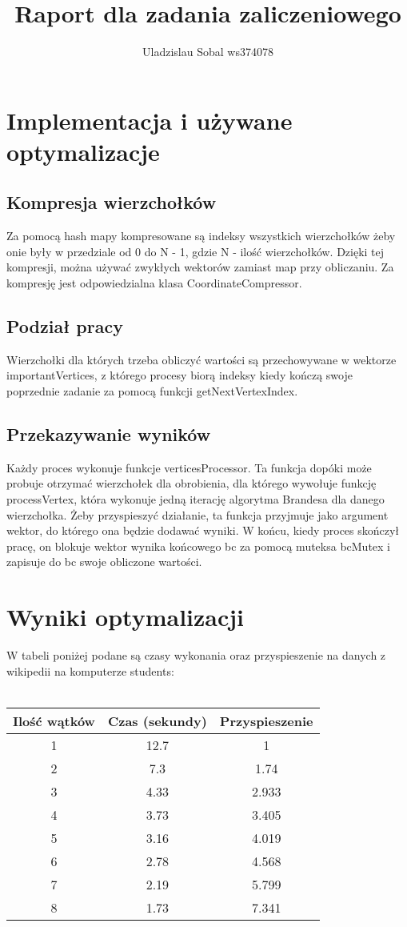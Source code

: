 \documentclass[a4paper]{article}
\author{Uladzislau Sobal ws374078}
\title{Raport dla zadania zaliczeniowego}
\begin{document}
\maketitle
\section*{Implementacja i używane optymalizacje}

\subsection*{Kompresja wierzchołków}
Za pomocą hash mapy kompresowane są indeksy wszystkich wierzchołków żeby 
onie były w przedziale od 0 do N - 1, gdzie N - ilość wierzchołków. Dzięki 
tej kompresji, można używać zwykłych wektorów zamiast map 
przy obliczaniu. Za kompresję jest odpowiedzialna klasa CoordinateCompressor.

\subsection*{Podział pracy}
Wierzchołki dla których trzeba obliczyć wartości są przechowywane w wektorze importantVertices, z którego procesy biorą 
indeksy kiedy kończą swoje poprzednie zadanie za pomocą funkcji getNextVertexIndex.

\subsection*{Przekazywanie wyników}
Każdy proces wykonuje funkcje verticesProcessor. Ta funkcja dopóki może probuje otrzymać wierzchołek dla obrobienia, dla którego wywołuje funkcję processVertex, która wykonuje jedną iterację 
algorytma Brandesa dla danego wierzchołka. Żeby 
przyspieszyć działanie, ta funkcja przyjmuje jako argument wektor, do którego ona będzie dodawać wyniki.
W końcu, kiedy proces skończył pracę, on blokuje wektor wynika końcowego bc za pomocą muteksa bcMutex i zapisuje do bc swoje obliczone wartości.

\section*{Wyniki optymalizacji}
W tabeli poniżej podane są czasy wykonania oraz przyspieszenie na danych z wikipedii na komputerze students:
\\
\\
\begin{tabular}{|c|c|c|}
    \hline
    Ilość wątków & Czas (sekundy) & Przyspieszenie \\
    \hline
    1 & 12.7 & 1\\
    2 & 7.3 & 1.74\\
    3 & 4.33 & 2.933\\
    4 & 3.73 & 3.405\\
    5 & 3.16 & 4.019\\
    6 & 2.78 & 4.568\\
    7 & 2.19 & 5.799\\
    8 & 1.73 & 7.341\\
\hline


\end{tabular}
\end{document}
